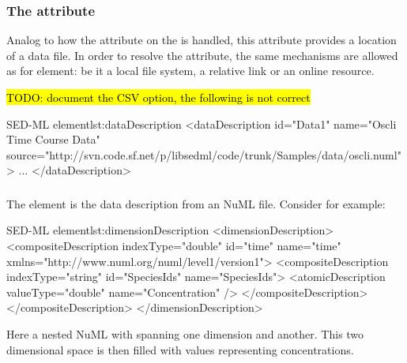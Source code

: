 \subsubsection{The  attribute}
\label{sec:data_source}
Analog to how the  attribute on the \SedModel is handled, this attribute provides a location of a data file. In order to resolve the  attribute, the same mechanisms are allowed as for \SedModel element: be it a local file system, a relative link or an online resource.

\hl{TODO: document the CSV option, the following is not correct}

\begin{myXmlLst}{SED-ML  element}{lst:dataDescription}
   <dataDescription id="Data1" name="Oscli Time Course Data" 
     source="http://svn.code.sf.net/p/libsedml/code/trunk/Samples/data/oscli.numl" >
     ...
    </dataDescription>
\end{myXmlLst} 


\subsubsection{}
\label{class:dimensionDescription}

The  element is the data description from an NuML file. Consider for example:

\begin{myXmlLst}{SED-ML  element}{lst:dimensionDescription}
    <dimensionDescription>
        <compositeDescription indexType="double" id="time" name="time" 
          xmlns="http://www.numl.org/numl/level1/version1">
        <compositeDescription indexType="string" id="SpeciesIds" name="SpeciesIds">
            <atomicDescription valueType="double" name="Concentration" />
        </compositeDescription>
        </compositeDescription>
    </dimensionDescription>
\end{myXmlLst} 

Here a nested NuML  with  spanning one dimension and  another. This two dimensional space is then filled with  values representing concentrations.


